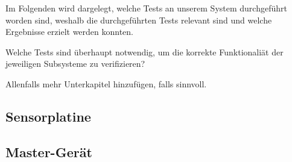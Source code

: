 Im Folgenden  wird dargelegt,  welche Tests  an unserem  System durchgef\"uhrt
worden  sind, weshalb  die  durchgef\"uhrten Tests  relevant  sind und  welche
Ergebnisse erzielt werden konnten.

\anweisung  Welche   Tests  sind   \"uberhaupt  notwendig,  um   die  korrekte
Funktionali\"at der jeweiligen Subsysteme zu verifizieren?

\anweisung Allenfalls mehr Unterkapitel hinzuf\"ugen, falls sinnvoll.

\subsection{Sensorplatine}
\label{subsec:test:sensorplatine}


\subsection{Master-Ger\"at}
\label{subsec:test:master}

